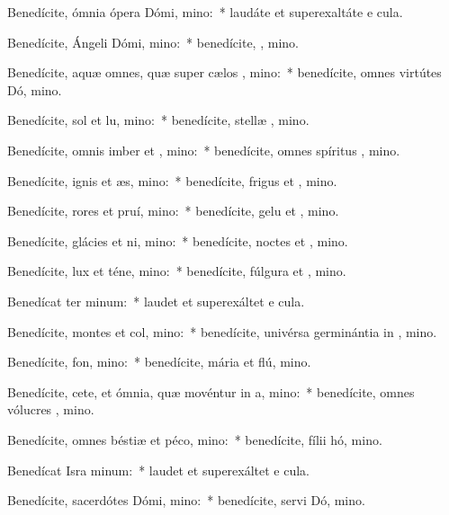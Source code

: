 \item Benedícite, ómnia ópera Dómi, mino:~* laudáte et superexaltáte e  cula.
\item Benedícite, Ángeli Dómi, mino:~* benedícite, , mino.
\item Benedícite, aquæ omnes, quæ super cælos , mino:~* benedícite, omnes virtútes Dó, mino.
\item Benedícite, sol et lu, mino:~* benedícite, stellæ , mino.
\item Benedícite, omnis imber et , mino:~* benedícite, omnes spíritus , mino.
\item Benedícite, ignis et æs, mino:~* benedícite, frigus et , mino.
\item Benedícite, rores et pruí, mino:~* benedícite, gelu et , mino.
\item Benedícite, glácies et ni, mino:~* benedícite, noctes et , mino.
\item Benedícite, lux et téne, mino:~* benedícite, fúlgura et , mino.
\item Benedícat ter minum:~* laudet et superexáltet e  cula.
\item Benedícite, montes et col, mino:~* benedícite, univérsa germinántia in , mino.
\item Benedícite, fon, mino:~* benedícite, mária et flú, mino.
\item Benedícite, cete, et ómnia, quæ movéntur in a, mino:~* benedícite, omnes vólucres , mino.
\item Benedícite, omnes béstiæ et péco, mino:~* benedícite, fílii hó, mino.
\item Benedícat Isra minum:~* laudet et superexáltet e  cula.
\item Benedícite, sacerdótes Dómi, mino:~* benedícite, servi Dó, mino.
